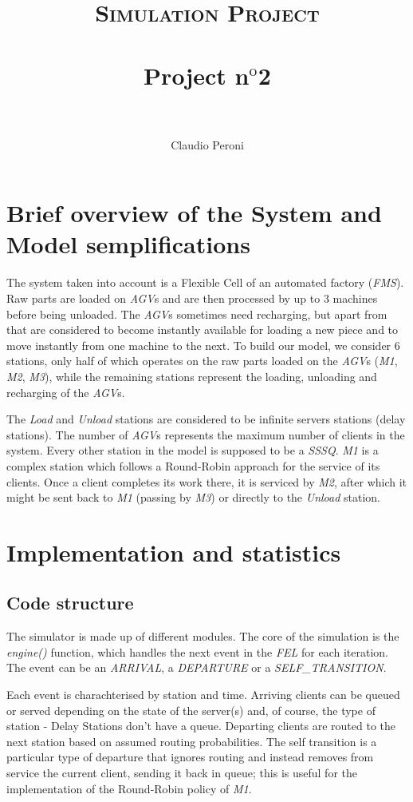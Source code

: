 \documentclass[paper=a4, fontsize=11pt]{scrartcl}
\title{
		\usefont{OT1}{bch}{b}{n}
		\normalfont \normalsize \textsc{Simulation Project} \\ [25pt]
		\horrule{0.5pt} \\[0.4cm]
		\huge Project n$^{\text{o}}$2\\
		\horrule{2pt} \\[0.5cm]
}
\author{
		\normalfont 								\normalsize
        Claudio Peroni\\[-3pt]		\normalsize
}
\date{}
\numberwithin{equation}{section}		%
\numberwithin{figure}{section}			%
\numberwithin{table}{section}				%
\begin{document}
\maketitle
\section{Brief overview of the System and Model semplifications}
The system taken into account is a Flexible Cell of an automated factory (\textit{FMS}).
Raw parts are loaded on \textit{AGV}s and are then processed by up to 3 machines before being unloaded. The \textit{AGV}s sometimes need recharging, but apart from that are considered to become instantly available for loading a new piece and to move instantly from one machine to the next.
To build our model, we consider 6 stations, only half of which operates on the raw parts loaded on the \textit{AGV}s (\textit{M1}, \textit{M2}, \textit{M3}), while the remaining stations represent the loading, unloading and recharging of the \textit{AGV}s.

The \textit{Load} and \textit{Unload} stations are considered to be infinite servers stations (delay stations). The number of \textit{AGV}s represents the maximum number of clients in the system. Every other station in the model is supposed to be a \textit{SSSQ}. \textit{M1} is a complex station which follows a Round-Robin approach for the service of its clients. Once a client completes its work there, it is serviced by \textit{M2}, after which it might be sent back to \textit{M1} (passing by \textit{M3}) or directly to the \textit{Unload} station.

\section{Implementation and statistics}
\subsection{Code structure}
The simulator is made up of different modules. The core of the simulation is the \textit{engine()} function, which handles the next event in the \textit{FEL} for each iteration. The event can be an \textit{ARRIVAL}, a \textit{DEPARTURE} or a \textit{SELF\_TRANSITION}.

Each event is charachterised by station and time. Arriving clients can be queued or served depending on the state of the server(s) and, of course, the type of station - Delay Stations don't have a queue. Departing clients are routed to the next station based on assumed routing probabilities. The self transition is a particular type of departure that ignores routing and instead removes from service the current client, sending it back in queue; this is useful for the implementation of the Round-Robin policy of \textit{M1}.
\end{document}
